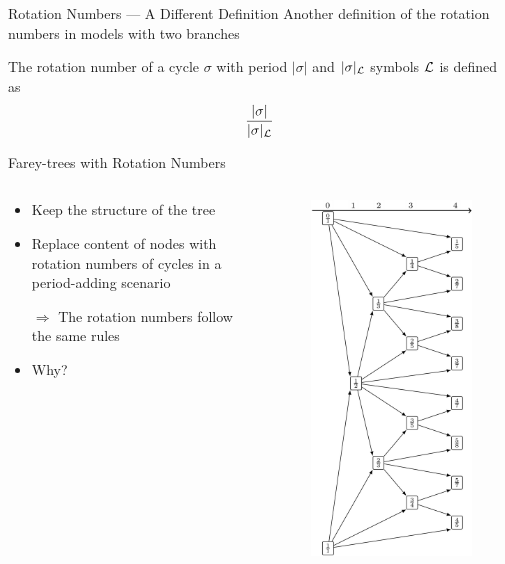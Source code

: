\begin{frame}{Rotation Numbers --- A Different Definition}
	Another definition of the rotation numbers in models with two branches
	\begin{definition}
		The rotation number of a cycle $\sigma$ with period $|\sigma|$ and $|\sigma|_{\mathcal{L}}$ symbols $\mathcal{L}$ is defined as
		\begin{align*}
			\frac{|\sigma|}{|\sigma|_{\mathcal{L}}}
		\end{align*}
	\end{definition}
\end{frame}

\begin{frame}{Farey-trees with Rotation Numbers}
	\begin{columns}
		\begin{column}{.5 \textwidth}
			\begin{itemize}
				\item Keep the structure of the tree
				\item Replace content of nodes with rotation numbers of cycles in a period-adding scenario
				\item[$\Rightarrow$] The rotation numbers follow the same rules
				\item Why?
			\end{itemize}
		\end{column}
		\begin{column}{.5 \textwidth}
			\vspace{-5em}
			\begin{figure}
				\includegraphics[width=.47 \textwidth]{../../Report/Figures/FareyTrees/LR_RotNum/adding.png}
			\end{figure}
		\end{column}
	\end{columns}
\end{frame}


